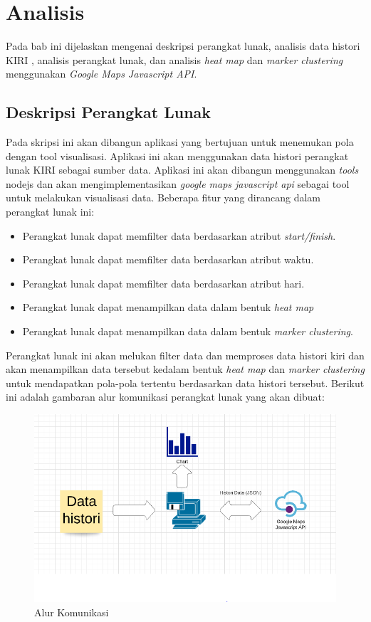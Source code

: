 \chapter{Analisis}
\label{chap:analisis}
Pada bab ini dijelaskan mengenai deskripsi perangkat lunak,  analisis data histori KIRI , analisis perangkat lunak, dan analisis \textit{heat map} dan \textit{marker clustering} menggunakan  \textit{Google Maps Javascript API}.

\section{Deskripsi Perangkat Lunak}
\label{sec:deskripsiPL}
Pada skripsi ini akan dibangun aplikasi yang bertujuan untuk menemukan pola dengan tool visualisasi. Aplikasi ini akan menggunakan data histori perangkat lunak KIRI sebagai sumber data. Aplikasi ini akan dibangun menggunakan \textit{tools} nodejs dan akan mengimplementasikan \textit{google maps javascript api} sebagai tool untuk melakukan visualisasi data. Beberapa fitur yang dirancang dalam perangkat lunak ini:
\begin{itemize}
\item Perangkat lunak dapat memfilter data berdasarkan atribut \textit{start/finish}.
\item Perangkat lunak dapat memfilter data berdasarkan atribut waktu.
\item Perangkat lunak dapat memfilter data berdasarkan atribut hari.
\item Perangkat lunak dapat menampilkan data dalam bentuk \textit{heat map}
\item Perangkat lunak dapat menampilkan data dalam bentuk \textit{marker clustering}.
\end{itemize}
Perangkat lunak ini akan melukan filter data dan memproses data histori kiri dan akan menampilkan data tersebut kedalam bentuk \textit{heat map} dan \textit{marker clustering} untuk mendapatkan pola-pola tertentu berdasarkan data histori tersebut. Berikut ini adalah gambaran alur komunikasi perangkat lunak yang akan dibuat:

\begin{figure}[H]
	\centering  
	\includegraphics[scale=0.55]{Gambar/software-flow.PNG}  
	\caption[Alur Komunikasi]{Alur Komunikasi} 
	\label{fig:alurKomunikasi} 
\end{figure} 


